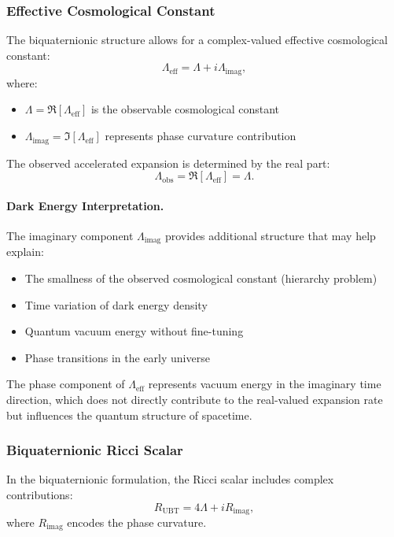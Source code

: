 \subsubsection{Effective Cosmological Constant}

The biquaternionic structure allows for a complex-valued effective cosmological constant:
\begin{equation}
\Lambda_{\text{eff}} = \Lambda + i\Lambda_{\text{imag}},
\label{eq:complex_lambda}
\end{equation}
where:
\begin{itemize}
\item $\Lambda = \Re[\Lambda_{\text{eff}}]$ is the observable cosmological constant
\item $\Lambda_{\text{imag}} = \Im[\Lambda_{\text{eff}}]$ represents phase curvature contribution
\end{itemize}

The observed accelerated expansion is determined by the real part:
\begin{equation}
\Lambda_{\text{obs}} = \Re[\Lambda_{\text{eff}}] = \Lambda.
\end{equation}

\paragraph{Dark Energy Interpretation.}
The imaginary component $\Lambda_{\text{imag}}$ provides additional structure that may help explain:
\begin{itemize}
\item The smallness of the observed cosmological constant (hierarchy problem)
\item Time variation of dark energy density
\item Quantum vacuum energy without fine-tuning
\item Phase transitions in the early universe
\end{itemize}

The phase component of $\Lambda_{\text{eff}}$ represents vacuum energy in the imaginary time direction, which does not directly contribute to the real-valued expansion rate but influences the quantum structure of spacetime.

\subsubsection{Biquaternionic Ricci Scalar}

In the biquaternionic formulation, the Ricci scalar includes complex contributions:
\begin{equation}
R_{\text{UBT}} = 4\Lambda + iR_{\text{imag}},
\end{equation}
where $R_{\text{imag}}$ encodes the phase curvature.

